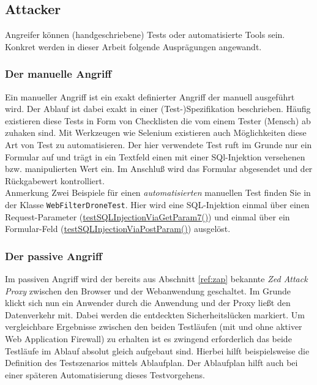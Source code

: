 \subsection{Attacker}
Angreifer können (handgeschriebene) Tests oder automatisierte Tools sein. Konkret werden in dieser Arbeit folgende Ausprägungen angewandt.

\subsubsection{Der manuelle Angriff}

Ein manueller Angriff ist ein exakt definierter Angriff der manuell ausgeführt wird. Der Ablauf ist dabei exakt in einer (Test-)Spezifikation beschrieben. Häufig existieren diese Tests in Form von Checklisten die vom einem Tester (Mensch) ab zuhaken sind. Mit Werkzeugen wie Selenium existieren auch Möglichkeiten diese Art von Test zu automatisieren. Der hier verwendete Test ruft im Grunde nur ein Formular auf und trägt in ein Textfeld einen mit einer SQl-Injektion versehenen bzw. manipulierten Wert ein. Im Anschluß wird das Formular abgesendet und der Rückgabewert kontrolliert.\\

\textcolor{bhtGray}{ Anmerkung} Zwei Beispiele für einen \glqq\emph{automatisierten}\grqq{} manuellen Test finden Sie in der Klasse \verb=WebFilterDroneTest=. Hier wird eine SQL-Injektion einmal über einen Request-Parameter (\href{https://github.com/devtty/webcastellum/blob/3c45a017e2aa17e553d2517308210ab7bf614904/src/test/java/org/webcastellum/test/WebFilterDroneTest.java\#L88}{testSQLInjectionViaGetParam7()}) und einmal über ein Formular-Feld (\href{https://github.com/devtty/webcastellum/blob/3c45a017e2aa17e553d2517308210ab7bf614904/src/test/java/org/webcastellum/test/WebFilterDroneTest.java\#L121}{testSQLInjectionViaPostParam()}) ausgelöst.


\subsubsection{Der passive Angriff}
Im passiven Angriff wird der bereits aus Abschnitt \ref{ref:zap} bekannte \emph{Zed Attack Proxy} zwischen den Browser und der Webanwendung geschaltet. Im Grunde klickt sich nun ein Anwender durch die Anwendung und der Proxy ließt den Datenverkehr mit. Dabei werden die entdeckten Sicherheitslücken markiert. Um vergleichbare Ergebnisse zwischen den beiden Testläufen (mit und ohne aktiver Web Application Firewall) zu erhalten ist es zwingend erforderlich das beide Testläufe im Ablauf absolut gleich aufgebaut sind. Hierbei hilft beispielsweise die Definition des Testszenarios mittels Ablaufplan. Der Ablaufplan hilft auch bei einer späteren Automatisierung dieses Testvorgehens.

